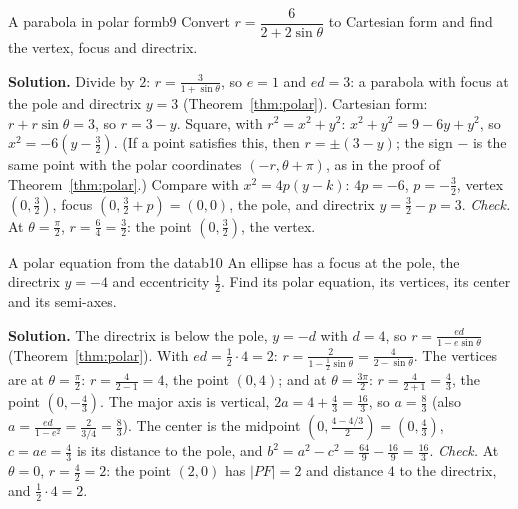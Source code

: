 \documentclass[11pt]{article}
\begin{document}
\begin{exmp}{A parabola in polar form}{b9}
Convert $r=\dfrac6{2+2\sin\theta}$ to Cartesian form and find the vertex, focus and directrix.

\textbf{Solution.} Divide by $2$: $r=\frac3{1+\sin\theta}$, so $e=1$ and $ed=3$: a parabola with focus at the pole and directrix $y=3$ (Theorem~\ref{thm:polar}). Cartesian form: $r+r\sin\theta=3$, so $r=3-y$. Square, with $r^2=x^2+y^2$: $x^2+y^2=9-6y+y^2$, so $x^2=-6\left(y-\frac32\right)$. (If a point satisfies this, then $r=\pm(3-y)$; the sign $-$ is the same point with the polar coordinates $(-r,\theta+\pi)$, as in the proof of Theorem~\ref{thm:polar}.) Compare with $x^2=4p(y-k)$: $4p=-6$, $p=-\frac32$, vertex $\left(0,\frac32\right)$, focus $\left(0,\frac32+p\right)=(0,0)$, the pole, and directrix $y=\frac32-p=3$.
\emph{Check.} At $\theta=\frac\pi2$, $r=\frac64=\frac32$: the point $\left(0,\frac32\right)$, the vertex.
\end{exmp}

\begin{exmp}{A polar equation from the data}{b10}
An ellipse has a focus at the pole, the directrix $y=-4$ and eccentricity $\frac12$. Find its polar equation, its vertices, its center and its semi-axes.

\textbf{Solution.} The directrix is below the pole, $y=-d$ with $d=4$, so $r=\frac{ed}{1-e\sin\theta}$ (Theorem~\ref{thm:polar}). With $ed=\frac12\cdot4=2$: $r=\frac2{1-\frac12\sin\theta}=\frac4{2-\sin\theta}$. The vertices are at $\theta=\frac\pi2$: $r=\frac4{2-1}=4$, the point $(0,4)$; and at $\theta=\frac{3\pi}2$: $r=\frac4{2+1}=\frac43$, the point $\left(0,-\frac43\right)$. The major axis is vertical, $2a=4+\frac43=\frac{16}3$, so $a=\frac83$ (also $a=\frac{ed}{1-e^2}=\frac{2}{3/4}=\frac83$). The center is the midpoint $\left(0,\frac{4-4/3}2\right)=\left(0,\frac43\right)$, $c=ae=\frac43$ is its distance to the pole, and $b^2=a^2-c^2=\frac{64}9-\frac{16}9=\frac{16}3$.
\emph{Check.} At $\theta=0$, $r=\frac42=2$: the point $(2,0)$ has $\lvert PF\rvert=2$ and distance $4$ to the directrix, and $\frac12\cdot4=2$.
\end{exmp}
\end{document}
